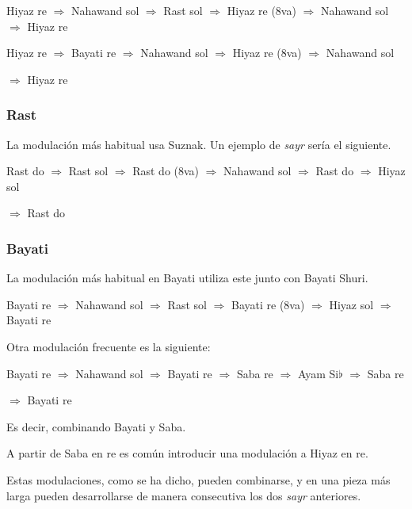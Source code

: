 Hiyaz re $\Rightarrow$ Nahawand sol $\Rightarrow$ Rast sol $\Rightarrow$ Hiyaz re (8va) $\Rightarrow$ Nahawand sol $\Rightarrow$ Hiyaz re

Hiyaz re $\Rightarrow$ Bayati re $\Rightarrow$ Nahawand sol $\Rightarrow$ Hiyaz re (8va) $\Rightarrow$ Nahawand sol

$\Rightarrow$ Hiyaz re

\subsubsection{\Maqam Rast}

La modulación más habitual usa \maqam Suznak. Un ejemplo de \emph{sayr} sería el siguiente.

Rast do $\Rightarrow$ Rast sol $\Rightarrow$ Rast do (8va) $\Rightarrow$ Nahawand sol $\Rightarrow$ Rast do $\Rightarrow$ Hiyaz sol

$\Rightarrow$ Rast do

\subsubsection{\Maqam Bayati}

La modulación más habitual en \maqam Bayati utiliza este junto con \maqam Bayati Shuri.

Bayati re $\Rightarrow$ Nahawand sol $\Rightarrow$ Rast sol $\Rightarrow$ Bayati re (8va) $\Rightarrow$ Hiyaz sol $\Rightarrow$ Bayati re

Otra modulación frecuente es la siguiente:

Bayati re $\Rightarrow$ Nahawand sol $\Rightarrow$ Bayati re $\Rightarrow$ Saba re $\Rightarrow$ Ayam Si$\flat$ $\Rightarrow$ Saba re

$\Rightarrow$ Bayati re

Es decir, combinando \maqam Bayati y \maqam Saba.

A partir de \maqam Saba en re es común introducir una modulación a \maqam Hiyaz en re.

Estas modulaciones, como se ha dicho, pueden combinarse, y en una pieza más larga pueden desarrollarse de manera consecutiva los dos \emph{sayr} anteriores.

\thispagestyle{empty}